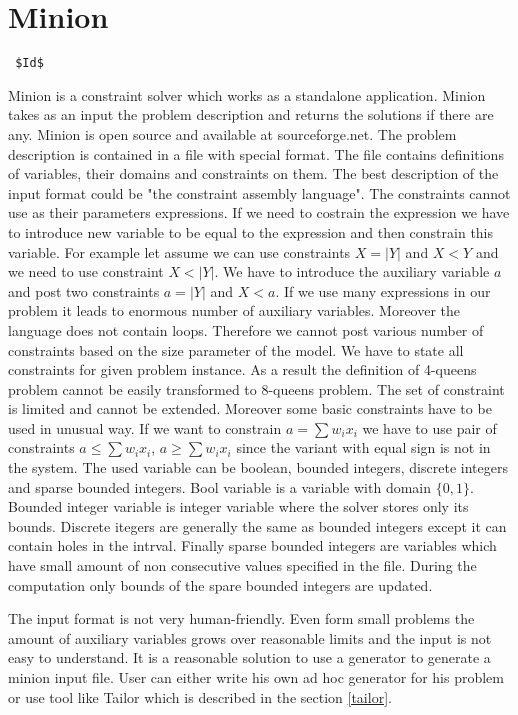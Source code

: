 \section{Minion}
\verb= $Id$ =

Minion is a constraint solver which works as a standalone application. Minion takes
as an input the problem description and returns the solutions if there are any.
Minion is open source and available at sourceforge.net. The problem description
is contained in a file with special format. The file contains definitions of variables,
their domains and constraints on them. The best description of the input format could
be "the constraint assembly language". The constraints cannot use as their parameters 
expressions. If we need to costrain the expression we have to introduce new variable
to be equal to the expression and then constrain this variable. For example let assume 
we can use constraints $X = |Y|$ and $X < Y$ and we need to use constraint $X < |Y|$.
We have to introduce the auxiliary variable $a$ and post two constraints $a = |Y|$ and
 $X < a$. If we use many expressions in our problem it leads to enormous number of
 auxiliary variables. Moreover the language does not contain loops. Therefore we
 cannot post various number of constraints based on the size parameter of the model.
 We have to state all constraints for given problem instance. As a result the definition
 of 4-queens problem cannot be easily transformed to 8-queens problem. The set of constraint
 is limited and cannot be extended. Moreover some basic constraints have to be used in unusual way.
 If we want to constrain $a = \sum{w_i x_i}$ we have to use pair of constraints
 $a \leq \sum{w_i x_i}$, $a \geq \sum{w_i x_i}$ since the variant with equal sign
 is not in the system. The used variable can be boolean, bounded integers, discrete integers
 and sparse bounded integers. Bool variable is a variable with domain $\{0,1\}$.
 Bounded integer variable is integer variable where the solver stores only its bounds.
 Discrete itegers are generally the same as bounded integers except it can contain 
 holes in the intrval. Finally sparse bounded integers are variables which have small
 amount of non consecutive values specified in the file. During the computation
 only bounds of the spare bounded integers are updated.  
 
The input format is not very human-friendly. Even form small problems the amount of
auxiliary variables grows over reasonable limits and the input is not easy to understand.
It is a reasonable solution to use a generator to generate a minion input file.
User can either write his own ad hoc generator for his problem or use tool like
Tailor which is described in the section \ref{tailor}.

